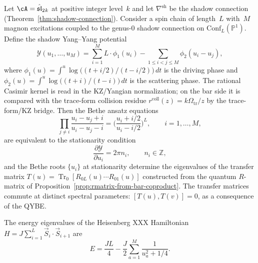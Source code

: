 \begin{theorem}
\label{thm:bae-from-mc-stationarity}
Let $\cA = \hat{\mathfrak{sl}}_2{}_k$ at positive integer level~$k$
and let $\nabla^{\mathrm{sh}}$ be the shadow connection
\textup{(}Theorem~\textup{\ref{thm:shadow-connection})}. Consider a
spin chain of length~$L$ with~$M$ magnon excitations coupled to the
genus-$0$ shadow connection on $\mathrm{Conf}_L(\mathbb{P}^1)$.
Define the shadow Yang--Yang potential
\begin{equation}\label{eq:shadow-yang-yang}
\mathcal{Y}(u_1, \ldots, u_M)
= \sum_{i=1}^{M}
 L \cdot \phi_1(u_i)
 - \sum_{1 \le i < j \le M}
 \phi_2(u_i - u_j),
\end{equation}
where $\phi_1(u) = \int^u \log\bigl((t + i/2)/(t - i/2)\bigr)\, dt$
is the driving phase and $\phi_2(u) = \int^u \log\bigl((t+i)/(t-i)\bigr)\, dt$
is the scattering phase. The rational Casimir kernel is read in the
KZ/Yangian normalization; on the bar side it is compared with the
trace-form collision residue
$r^{\mathrm{coll}}(z)=k\Omega_{\mathrm{tr}}/z$
by the trace-form/KZ bridge.
Then the Bethe ansatz equations
\begin{equation}\label{eq:bae-xxx}
\prod_{j \neq i}
\frac{u_i - u_j + i}{u_i - u_j - i}
= \biggl(\frac{u_i + i/2}{u_i - i/2}\biggr)^{\!L},
\qquad i = 1, \ldots, M,
\end{equation}
are equivalent to the stationarity condition
\begin{equation}\label{eq:mc-stationarity}
\frac{\partial \mathcal{Y}}{\partial u_i} = 2\pi n_i,
\qquad n_i \in \mathbb{Z},
\end{equation}
and the Bethe roots $\{u_i\}$ at stationarity determine the
eigenvalues of the transfer matrix
$T(u) = \operatorname{Tr}_0[R_{0L}(u) \cdots R_{01}(u)]$
constructed from the quantum $R$-matrix of
Proposition~\textup{\ref{prop:rmatrix-from-bar-coproduct}}. The
transfer matrices commute at distinct spectral parameters:
$[T(u), T(v)] = 0$,
as a consequence of the QYBE.

The energy eigenvalues of the Heisenberg XXX Hamiltonian
$H = J \sum_{i=1}^{L} \vec{S}_i \cdot \vec{S}_{i+1}$ are
\begin{equation}\label{eq:bethe-energy}
E = \frac{JL}{4}
 - \frac{J}{2} \sum_{a=1}^{M}
 \frac{1}{u_a^2 + 1/4}.
\end{equation}
\end{theorem}

